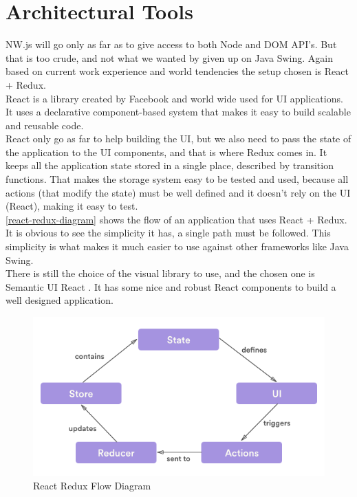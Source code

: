 \section{Architectural Tools}
NW.js will go only as far as to give access to both Node and DOM API's. But that
is too crude, and not what we wanted by given up on Java Swing. Again based on
current work experience and world tendencies the setup chosen is React + Redux. \\
React \cite{React} is a library created by Facebook and world wide used for UI applications.
It uses a declarative component-based system that makes it easy to build scalable
and reusable code.\\
React only go as far to help building the UI, but we also need to pass the state
of the application to the UI components, and that is where Redux comes in. It
keeps all the application state stored in a single place, described by transition
functions. That makes the storage system easy to be tested and used, because all
actions (that modify the state) must be well defined and it doesn't rely on the
UI (React), making it easy to test.\\
\autoref{react-redux-diagram} shows the flow of an application that uses
React + Redux. It is obvious to see the simplicity it has, a single path must be followed.
This simplicity is what makes it much easier to use against other frameworks like
Java Swing. \\
There is still the choice of the visual library to use, and the chosen one is
Semantic UI React \cite{semantic-ui}. It has some nice and robust React components
to build a well designed application.

\begin{figure}[htb]
  \centering
  \caption{React Redux Flow Diagram}
  \label{react-redux-diagram}
  \includegraphics[scale=0.5]{images/react-redux-diagram.png}
\end{figure}

